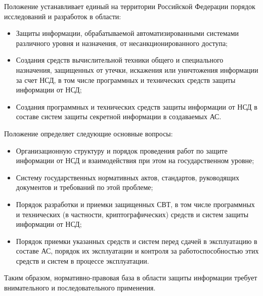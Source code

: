 Положение устанавливает единый на территории Российской Федерации порядок исследований и разработок в области:
\begin{itemize}
	\item Защиты информации, обрабатываемой автоматизированными системами различного уровня и назначения, от несанкционированного доступа;
	\item Создания средств вычислительной техники общего и специального назначения, защищенных от утечки, искажения или уничтожения информации за счет НСД, в том числе программных и технических средств защиты информации от НСД;
	\item Создания программных и технических средств защиты информации от НСД в составе систем защиты секретной информации в создаваемых АС.
\end{itemize}
Положение определяет следующие основные вопросы:
\begin{itemize}
	\item Организационную структуру и порядок проведения работ по защите информации от НСД и взаимодействия при этом на государственном уровне;
	\item Систему государственных нормативных актов, стандартов, руководящих документов и требований по этой проблеме;
	\item Порядок разработки и приемки защищенных СВТ, в том числе программных и технических (в частности, криптографических) средств и систем защиты информации от НСД;
	\item Порядок приемки указанных средств и систем перед сдачей в эксплуатацию в составе АС, порядок их эксплуатации и контроля за работоспособностью этих средств и систем в процессе эксплуатации.
\end{itemize}

Таким образом, нормативно-правовая база в области защиты информации требует внимательного и последовательного применения.